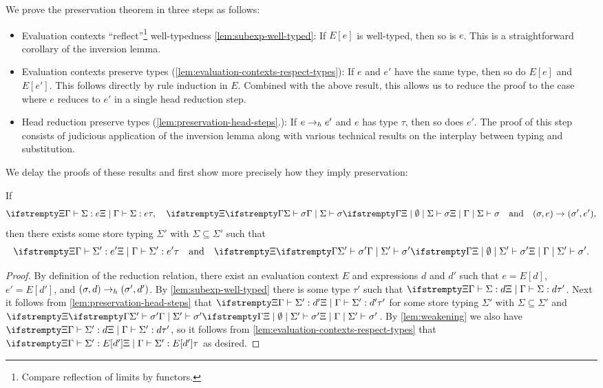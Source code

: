 We prove the preservation theorem in three steps as follows: %
%
\begin{itemize}
    \item Evaluation contexts \enquote{reflect}\footnote{Compare reflection of limits by functors.} well-typedness \cref{lem:subexp-well-typed}: If $E[e]$ is well-typed, then so is $e$. This is a straightforward corollary of the inversion lemma.

    \item Evaluation contexts preserve types (\cref{lem:evaluation-contexts-respect-types}): If $e$ and $e'$ have the same type, then so do $E[e]$ and $E[e']$. This follows directly by rule induction in $E$. Combined with the above result, this allows us to reduce the proof to the case where $e$ reduces to $e'$ in a single head reduction step.

    \item Head reduction preserve types (\cref{lem:preservation-head-steps}.): If $e \to_h e'$ and $e$ has type $\tau$, then so does $e'$. The proof of this step consists of judicious application of the inversion lemma along with various technical results on the interplay between typing and substitution.
\end{itemize}
%
We delay the proofs of these results and first show more precisely how they imply preservation:

\begin{theorem}[Preservation]
    \label{thm:preservation}
    If
    \begin{equation*}
        \typerel{\Xi}{\Gamma}{\Sigma}{e}{\tau},
        \quad
        \stotype{\Xi}{\Gamma}{\Sigma}{\sigma}
        \quad \text{and} \quad
        (\sigma,e) \step (\sigma',e'),
    \end{equation*}
    then there exists some store typing $\Sigma'$ with $\Sigma \subseteq \Sigma'$ such that
    \begin{equation*}
        \typerel{\Xi}{\Gamma}{\Sigma'}{e'}{\tau}
        \quad \text{and} \quad
        \stotype{\Xi}{\Gamma}{\Sigma'}{\sigma'}.
    \end{equation*}
\end{theorem}

\begin{proof}
    By definition of the reduction relation, there exist an evaluation context $E$ and expressions $d$ and $d'$ such that $e = E[d]$, $e' = E[d']$, and $(\sigma,d) \to_h (\sigma',d')$. By \cref{lem:subexp-well-typed} there is some type $\tau'$ such that $\typerel{\Xi}{\Gamma}{\Sigma}{d}{\tau'}$. Next it follows from \cref{lem:preservation-head-steps} that $\typerel{\Xi}{\Gamma}{\Sigma'}{d'}{\tau'}$ for some store typing $\Sigma'$ with $\Sigma \subseteq \Sigma'$ and $\stotype{\Xi}{\Gamma}{\Sigma'}{\sigma'}$. By \cref{lem:weakening} we also have $\typerel{\Xi}{\Gamma}{\Sigma'}{d}{\tau'}$, so it follows from \cref{lem:evaluation-contexts-respect-types} that $\typerel{\Xi}{\Gamma}{\Sigma'}{E[d']}{\tau}$ as desired.
\end{proof}


